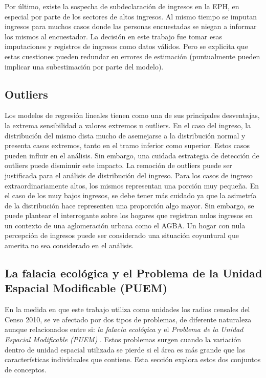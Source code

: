 Por último, existe la sospecha de subdeclaración de ingresos en la EPH, en especial por parte de los sectores de altos ingresos. Al mismo tiempo se imputan ingresos para muchos casos donde las personas encuestadas se niegan a informar los mismos al encuestador. La decisión en este trabajo fue tomar esas imputaciones y registros de ingresos como datos válidos. Pero se explicita que estas cuestiones pueden redundar en errores de estimación (puntualmente pueden implicar una subestimación por parte del modelo).
	
	\subsection{Outliers}
	
Los modelos de regresión lineales tienen como una de sus principales desventajas, la extrema sensibilidad a valores extremos u outliers. En el caso del ingreso, la distribución del mismo dista mucho de asemejarse a la distribución normal y presenta casos extremos, tanto en el tramo inferior como superior. Estos casos pueden influir en el análisis. Sin embargo, una cuidada estrategia de detección de outliers puede disminuir este impacto. La remoción de outliers puede ser justificada para el análisis de distribución del ingreso. Para los casos de ingreso extraordinariamente altos, los mismos representan una porción muy pequeña. En el caso de los muy bajos ingresos, se debe tener más cuidado  ya que la asimetría de la distribución hace representen una proporción algo mayor. Sin embargo, se puede plantear el interrogante sobre los hogares que registran nulos ingresos en un contexto de una aglomeración urbana como el AGBA. Un hogar con nula percepción de ingresos puede ser considerado una situación coyuntural que amerita no sea considerado en el análisis.  


	\subsection{La falacia ecológica y el Problema   de   la   Unidad   Espacial   Modificable   (PUEM)}


En la medida en que este trabajo utiliza como unidades los radios censales del Censo 2010, se ve afectado por dos tipos de problemas, de diferente naturaleza aunque relacionados entre si: \textit{la falacia ecológica} y el \textit{Problema   de   la   Unidad   Espacial   Modificable   (PUEM)} {\cite{openshaw1977, openshaw1984}}. Estos problemas surgen cuando la variación dentro de unidad espacial utilizada se pierde si el área es más grande que las características individuales que contiene. Esta sección explora estos dos conjuntos de conceptos.
 
